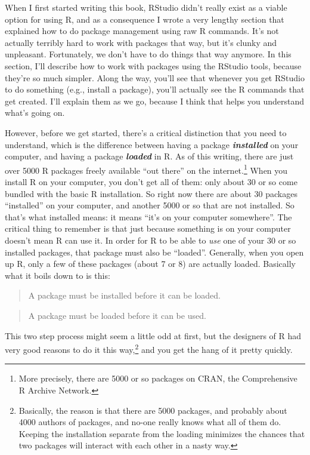 \documentclass[
]{book}
\begin{document}
When I first started writing this book, RStudio didn't really exist as a viable option for using R, and as a consequence I wrote a very lengthy section that explained how to do package management using raw R commands. It's not actually terribly hard to work with packages that way, but it's clunky and unpleasant. Fortunately, we don't have to do things that way anymore. In this section, I'll describe how to work with packages using the RStudio tools, because they're so much simpler. Along the way, you'll see that whenever you get RStudio to do something (e.g., install a package), you'll actually see the R commands that get created. I'll explain them as we go, because I think that helps you understand what's going on.

However, before we get started, there's a critical distinction that you need to understand, which is the difference between having a package \textbf{\emph{installed}} on your computer, and having a package \textbf{\emph{loaded}} in R. As of this writing, there are just over 5000 R packages freely available ``out there'' on the internet.\footnote{More precisely, there are 5000 or so packages on CRAN, the Comprehensive R Archive Network.} When you install R on your computer, you don't get all of them: only about 30 or so come bundled with the basic R installation. So right now there are about 30 packages ``installed'' on your computer, and another 5000 or so that are not installed. So that's what installed means: it means ``it's on your computer somewhere''. The critical thing to remember is that just because something is on your computer doesn't mean R can use it. In order for R to be able to \emph{use} one of your 30 or so installed packages, that package must also be ``loaded''. Generally, when you open up R, only a few of these packages (about 7 or 8) are actually loaded. Basically what it boils down to is this:

\begin{quote}
A package must be installed before it can be loaded.
\end{quote}

\begin{quote}
A package must be loaded before it can be used.
\end{quote}

This two step process might seem a little odd at first, but the designers of R had very good reasons to do it this way,\footnote{Basically, the reason is that there are 5000 packages, and probably about 4000 authors of packages, and no-one really knows what all of them do. Keeping the installation separate from the loading minimizes the chances that two packages will interact with each other in a nasty way.} and you get the hang of it pretty quickly.
\end{document}
